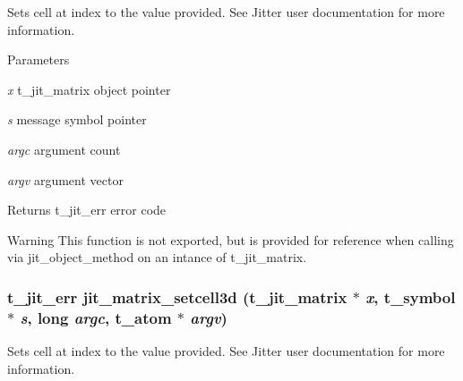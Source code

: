 Sets cell at index to the value provided. See Jitter user documentation for more information.


\begin{DoxyParams}{Parameters}
\item[{\em x}]t\_\-jit\_\-matrix object pointer \item[{\em s}]message symbol pointer \item[{\em argc}]argument count \item[{\em argv}]argument vector\end{DoxyParams}
\begin{DoxyReturn}{Returns}
t\_\-jit\_\-err error code
\end{DoxyReturn}
\begin{DoxyWarning}{Warning}
This function is not exported, but is provided for reference when calling via jit\_\-object\_\-method on an intance of t\_\-jit\_\-matrix. 
\end{DoxyWarning}
\hypertarget{group__matrixmod_ga7612675d9dc36cfd94a1adbac04e8719}{
\subsubsection[{jit\_\-matrix\_\-setcell3d}]{\setlength{\rightskip}{0pt plus 5cm}t\_\-jit\_\-err jit\_\-matrix\_\-setcell3d (t\_\-jit\_\-matrix $\ast$ {\em x}, \/  {\bf t\_\-symbol} $\ast$ {\em s}, \/  long {\em argc}, \/  {\bf t\_\-atom} $\ast$ {\em argv})}}
\label{group__matrixmod_ga7612675d9dc36cfd94a1adbac04e8719}


Sets cell at index to the value provided. See Jitter user documentation for more information.


